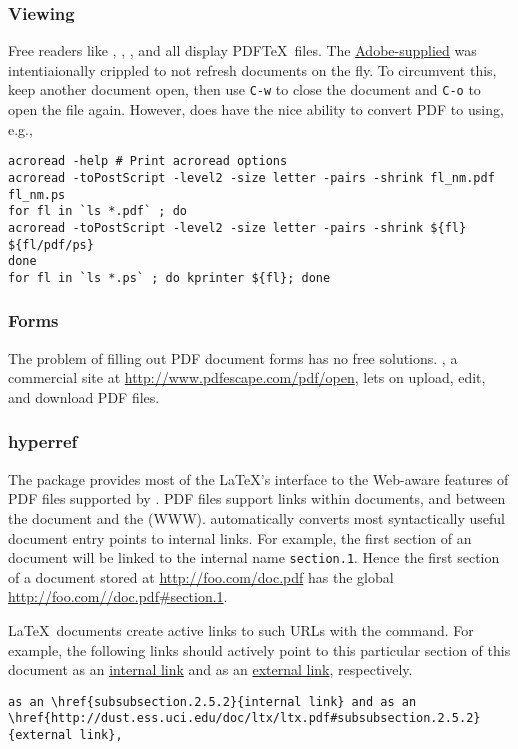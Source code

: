 \documentclass[12pt]{article}
\begin{document}
\subsubsection[Viewing]{Viewing}\label{sxn:pdf_vw}
Free readers like , , 
, and  all display PDF\TeX\ files.
The
\href{http://www.adobe.com/products/acrobat/alternate.html}{Adobe-supplied}
 was intentiaionally crippled to not refresh  
documents on the fly. 
To circumvent this, keep another document open, then use \verb'C-w'
to close the document and \verb'C-o' to open the file again.
However,  does have the nice ability to convert PDF to
 using, e.g., 
\begin{verbatim}
acroread -help # Print acroread options
acroread -toPostScript -level2 -size letter -pairs -shrink fl_nm.pdf fl_nm.ps
for fl in `ls *.pdf` ; do
acroread -toPostScript -level2 -size letter -pairs -shrink ${fl} ${fl/pdf/ps}
done
for fl in `ls *.ps` ; do kprinter ${fl}; done
\end{verbatim}

\subsubsection[Forms]{Forms}\label{sxn:pdf_frm}
The problem of filling out PDF document forms has no free solutions.
, a commercial site at
\url{http://www.pdfescape.com/pdf/open}, lets on
upload, edit, and download PDF files.

\subsubsection[hyperref]{hyperref}\label{sxn:hyperref}
The  package provides most of the \LaTeX's interface
to the Web-aware features of PDF files supported by .
PDF files support links within documents, and between the document 
and the  (WWW).
 automatically converts most syntactically useful
document entry points to internal links.
For example, the first section of an  document 
will be linked to the internal name \verb'section.1'.
Hence the first section of a document  stored at
\url{http://foo.com/doc.pdf} has the global 
\url{http://foo.com//doc.pdf#section.1}.

\LaTeX\ documents create active links to such URLs with the
\cmdltxidx{\href} command.
For example, the following links should actively point to this 
particular section of this document 
as an \href{subsubsection.2.5.2}{internal link} and as an
\href{http://dust.ess.uci.edu/doc/ltx/ltx.pdf#subsubsection.2.5.2}{external link},
respectively.
\begin{verbatim}
as an \href{subsubsection.2.5.2}{internal link} and as an
\href{http://dust.ess.uci.edu/doc/ltx/ltx.pdf#subsubsection.2.5.2}{external link},
\end{verbatim}
\end{document}
